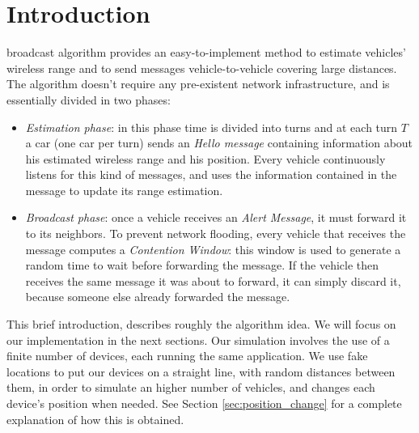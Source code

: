 \section{Introduction}
% 
% 
% 
% 
 broadcast algorithm provides an easy-to-implement method to estimate vehicles' wireless range and to send messages vehicle-to-vehicle covering large distances. The algorithm doesn't require any pre-existent network infrastructure, and is essentially divided in two phases:
	\begin{itemize}
		\item \emph{Estimation phase}: in this phase time is divided into turns and at each turn $T$ a car (one car per turn) sends an \emph{Hello message} containing information about his estimated wireless range and his position. Every vehicle continuously listens for this kind of messages, and uses the information contained in the message to update its range estimation.
		\item \emph{Broadcast phase}: 
		once a vehicle receives an \textit{Alert Message}, it must forward it to its neighbors. To prevent network flooding, every vehicle that receives the message computes a \textit{Contention Window}: this window is used to generate a random time to wait before forwarding the message. If the vehicle then receives the same message it was about to forward, it can simply discard it, because someone else already forwarded the message.
	\end{itemize} 
	
This brief introduction, describes roughly the algorithm idea. We will focus on our implementation in the next sections.
Our simulation involves the use of a finite number of devices, each running the same application. We use fake locations to put our devices on a straight line, with random distances between them, in order to simulate an higher number of vehicles, and changes each device's position when needed. See Section \ref{sec:position_change} for a complete explanation of how this is obtained.
